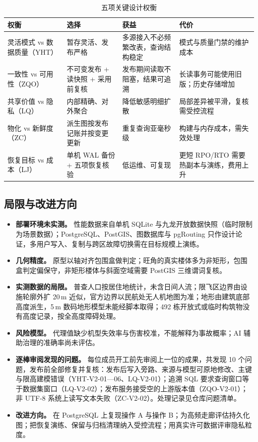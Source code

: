 \documentclass[a4paper,11pt,UTF8]{ctexart}
\begin{document}
\begin{table}[!htbp]\centering\small
\caption{五项关键设计权衡}
\begin{tabularx}{\textwidth}{L{2.6cm}L{3.6cm}YY}
\toprule
权衡 & 选择 & 获益 & 代价 \\
\midrule
灵活模式 vs 数据质量（YHT） & 暂存灵活、发布严格 & 多源接入不必频繁改表，查询结构稳定 & 模式与质量门禁的维护成本 \\
一致性 vs 可用性（ZQO） & 不可变发布 + 读快照 + 采用前复核 & 发布期间读取不阻塞，结果可追溯 & 长读事务可能使用旧版；历史存储增加 \\
共享价值 vs 隐私（LQ） & 内部精确、对外聚合 & 降低敏感明细扩散 & 局部差异被平滑，复核需受控流程 \\
物化 vs 新鲜度（ZC） & 派生图按发布记账并按变更更新 & 重复查询亚毫秒级 & 构建与内存成本，需失效处理 \\
恢复目标 vs 成本（LJ） & 单机 WAL 备份 + 五项恢复核验 & 低运维、可复现 & 更短 RPO/RTO 需要热副本与演练，费用上升 \\
\bottomrule
\end{tabularx}
\end{table}

\subsection{局限与改进方向}

\begin{itemize}
\item \textbf{部署环境未实测。} 性能数据来自单机 SQLite 与九龙开放数据快照（临时限制为场景数据）；PostgreSQL、PostGIS、图数据库与 pgRouting 只作设计论证，多用户写入、复制与跨区故障切换需在目标规模上演练。
\item \textbf{几何精度。} 原型以轴对齐包围盒做判定；旺角的真实楼体多为非矩形，包围盒判定偏保守，非矩形楼体与斜面空域需要 PostGIS 三维谓词复核。
\item \textbf{实测数据的局限。} 普查人口按居住地统计，未含日间人流；限飞区边界由设施轮廓外扩 20\,m 近似，官方边界以民航处无人机地图为准；地形由建筑底部高度派生，5\,m 数码地形模型未能经脚本取得；492 栋开放式或临时构筑物没有高度记录，按全高度障碍处理。
\item \textbf{风险模型。} 代理值缺少机型失效率与伤害校准，不能解释为事故概率；AI 辅助治理的准确率尚未评估。
\item \textbf{逐棒审阅发现的问题。} 每位成员开工前先审阅上一位的成果，共发现 10 个问题，发布前全部修复并复核：发布后写入旁路、来源与模型可原地修改、主键与限高建模错误（YHT-V2-01—06、LQ-V2-01）；追溯 SQL 要求查询窗口等于数据集窗口（LQ-V2-02）；发布服务接受空的上游版本值（ZQO-V2-01）；非 UTF-8 系统上读写文本失败（ZC-V2-02）。处理记录见仓库问题清单。
\item \textbf{改进方向。} 在 PostgreSQL 上复现操作 A 与操作 B；为高频走廊评估持久化图；把恢复演练、保留与归档清理纳入受控流程；用真实许可数据评审隐私粒度。
\end{itemize}
\end{document}
